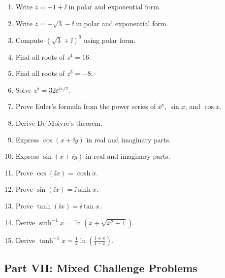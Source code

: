 \documentclass{otscience}
\begin{document}
\begin{practicebox}
\begin{enumerate}
\item Write \(z=-1+\ii\) in polar and exponential form.
\item Write \(z=-\sqrt3-\ii\) in polar and exponential form.
\item Compute \({(\sqrt3+\ii)}^6\) using polar form.
\item Find all roots of \(z^4=16\).
\item Find all roots of \(z^3=-8\).
\item Solve \(z^5=32\ee^{\ii\pi/2}\).
\item Prove Euler's formula from the power series of \(\ee^x\), \(\sin x\), and \(\cos x\).
\item Derive De Moivre's theorem.
\item Express \(\cos(x+\ii y)\) in real and imaginary parts.
\item Express \(\sin(x+\ii y)\) in real and imaginary parts.
\item Prove \(\cos(\ii x)=\cosh x\).
\item Prove \(\sin(\ii x)=\ii\sinh x\).
\item Prove \(\tanh(\ii x)=\ii\tan x\).
\item Derive \(\sinh^{-1}x=\ln(x+\sqrt{x^2+1})\).
\item Derive \(\tanh^{-1}x=\frac12\ln\left(\frac{1+x}{1-x}\right)\).
\end{enumerate}
\end{practicebox}

\subsection{Part VII: Mixed Challenge Problems}
\end{document}
